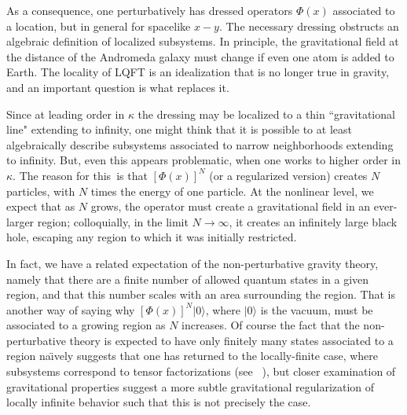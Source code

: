 As a consequence, one perturbatively has dressed operators $\Phi(x)$ associated to a location, but in general
%
\eqn{}
%
for spacelike $x-y$.  The necessary dressing obstructs an algebraic definition of localized subsystems.  In principle, the gravitational field at the distance of the Andromeda galaxy must change if even one atom is added to Earth.  The locality of LQFT is an idealization that is no longer true in gravity, and an important question is what replaces it.

Since at leading order in $\kappa$ the dressing may be localized to a thin ``gravitational line" extending to infinity\DoGione, one might think that it is possible to at least algebraically describe subsystems associated to narrow neighborhoods extending to infinity.  But, even this appears problematic, when one works to higher order in $\kappa$. The reason for this\SGalg\ is that $[\Phi(x)]^N$ (or a regularized version) creates $N$ particles, with $N$ times the energy of one particle.  At the nonlinear level, we expect that as $N$ grows, the operator must create a gravitational field in an ever-larger region; colloquially, in the limit $N\rightarrow\infty$, it creates an infinitely large black hole, escaping any region to which it was initially restricted.

In fact, we have a related expectation of the non-perturbative gravity theory, namely that there are a finite number of allowed quantum states in a given region, and that this number scales with an area surrounding the region. That is another way of saying why $[\Phi(x)]^N|0\rangle$, where $|0\rangle$ is the vacuum, must be associated to a growing region as $N$ increases.  Of course the fact that the non-perturbative theory is expected to have only finitely many states associated to a region na\"\i vely suggests that one has returned to the locally-finite case, where subsystems correspond to tensor factorizations (see \eg\ ), but closer examination of gravitational properties suggest a more subtle gravitational regularization of locally infinite behavior such that this is not precisely the case.

